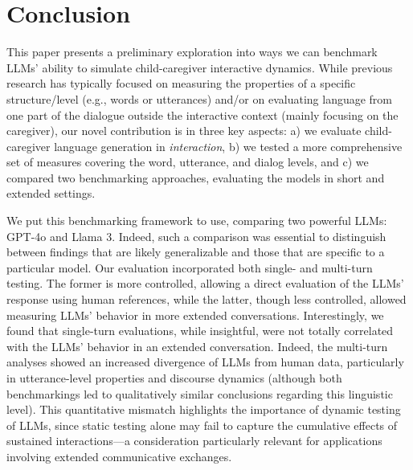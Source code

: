 \section{Conclusion}

This paper presents a preliminary exploration into ways we can benchmark LLMs' ability to simulate child-caregiver interactive dynamics. While previous research has typically focused on measuring the properties of a specific structure/level (e.g., words or utterances) and/or on evaluating language from one part of the dialogue outside the interactive context (mainly focusing on the caregiver), our novel contribution is in three key aspects: a) we evaluate child-caregiver language generation in \textit{interaction},  b) we tested a more comprehensive set of measures covering the word, utterance, and dialog levels, and c) we compared two benchmarking approaches, evaluating the models in short and extended settings. 



We put this benchmarking framework to use, comparing two powerful LLMs: GPT-4o and Llama 3. Indeed, such a comparison was essential to distinguish between findings that are likely generalizable and those that are specific to a particular model. Our evaluation incorporated both single- and multi-turn testing. The former is more controlled, allowing a direct evaluation of the LLMs' response using human references, while the latter, though less controlled, allowed measuring LLMs' behavior in more extended conversations. Interestingly, we found that single-turn evaluations, while insightful, were not totally correlated with the LLMs' behavior in an extended conversation. Indeed, the multi-turn analyses showed an increased divergence of LLMs from human data, particularly in utterance-level properties and discourse dynamics (although both benchmarkings led to qualitatively similar conclusions regarding this linguistic level). This quantitative mismatch highlights the importance of dynamic testing of LLMs, since static testing alone may fail to capture the cumulative effects of sustained interactions---a consideration particularly relevant for applications involving extended communicative exchanges.


